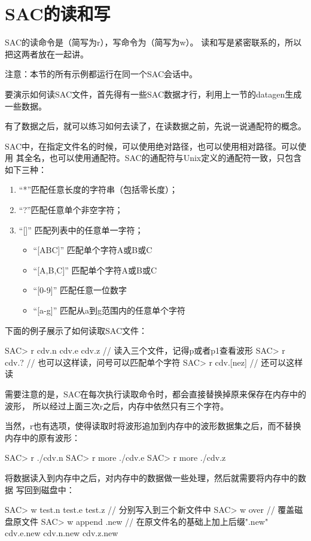 \section{SAC的读和写}
SAC的读命令是（简写为r），写命令为（简写为w）。
读和写是紧密联系的，所以把这两者放在一起讲。

注意：本节的所有示例都运行在同一个SAC会话中。

要演示如何读SAC文件，首先得有一些SAC数据才行，利用上一节的datagen生成一些数据。

有了数据之后，就可以练习如何去读了，在读数据之前，先说一说通配符的概念。

SAC中，在指定文件名的时候，可以使用绝对路径，也可以使用相对路径。可以使用
其全名，也可以使用通配符。SAC的通配符与Unix定义的通配符一致，只包含如下三种：
\begin{enumerate}
\item ``*''匹配任意长度的字符串（包括零长度）；
\item ``?''匹配任意单个非空字符；
\item ``[]'' 匹配列表中的任意单一字符；
    \begin{itemize}
    \item ``[ABC]'' 匹配单个字符A或B或C
    \item ``[A,B,C]'' 匹配单个字符A或B或C
    \item ``[0-9]'' 匹配任意一位数字
    \item ``[a-g]'' 匹配从a到g范围内的任意单个字符
    \end{itemize}
\end{enumerate}

下面的例子展示了如何读取SAC文件：
\begin{SACCode}
SAC> r cdv.n cdv.e cdv.z    // 读入三个文件，记得p或者p1查看波形
SAC> r cdv.?                // 也可以这样读，问号可以匹配单个字符
SAC> r cdv.[nez]            // 还可以这样读
\end{SACCode}

需要注意的是，SAC在每次执行读取命令时，都会直接替换掉原来保存在内存中的波形，
所以经过上面三次r之后，内存中依然只有三个字符。

当然，r也有选项，使得读取时将波形追加到内存中的波形数据集之后，而不替换
内存中的原有波形：
\begin{SACCode}
SAC> r ./cdv.n 
SAC> r more ./cdv.e 
SAC> r more ./cdv.z
\end{SACCode}

将数据读入到内存中之后，对内存中的数据做一些处理，然后就需要将内存中的数据
写回到磁盘中：
\begin{SACCode}
SAC> w test.n test.e test.z         // 分别写入到三个新文件中
SAC> w over                         // 覆盖磁盘原文件
SAC> w append .new                  // 在原文件名的基础上加上后缀".new"
cdv.e.new cdv.n.new cdv.z.new
\end{SACCode}
